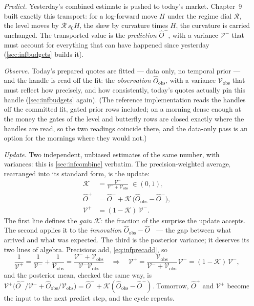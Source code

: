\emph{Predict.}  Yesterday's combined estimate is pushed to today's
market.  Chapter~9 built exactly this transport: for a log-forward
move $H$ under the regime dial $\mathcal{R}$, the level moves by
$\mathcal{R}\,s_0H$, the skew by curvature times $H$, the curvature
is carried unchanged.  The transported value is the
\emph{prediction} $\hat O^{-}$, with a variance
$\mathcal{V}^{-}$ that must account for everything that can have
happened since yesterday (\cref{sec:infbudgets} builds it).

\emph{Observe.}  Today's prepared quotes are fitted --- data only,
no temporal prior --- and the handle is read off the fit: the
\emph{observation} $\hat O_{\mathrm{obs}}$, with a variance
$\mathcal{V}_{\mathrm{obs}}$ that must reflect how precisely, and
how consistently, today's quotes actually pin this handle
(\cref{sec:infbudgets} again).  (The reference implementation reads
the handles off the committed fit, gated prior rows included; on a
morning dense enough at the money the gates of the level and
butterfly rows are closed exactly where the handles are read, so the
two readings coincide there, and the data-only pass is an option
for the mornings where they would not.)

\emph{Update.}  Two independent, unbiased estimates of the same
number, with variances: this is \cref{sec:infcombine} verbatim.
The precision-weighted average, rearranged into its standard form,
is the update:
\begin{equation}
\boxed{\;
\begin{aligned}
\mathcal{K}
&=\frac{\mathcal{V}^{-}}{\mathcal{V}^{-}+\mathcal{V}_{\mathrm{obs}}}
\;\in(0,1),\\
\hat O^{+}
&=\hat O^{-}+\mathcal{K}\,\bigl(\hat O_{\mathrm{obs}}-\hat O^{-}\bigr),\\
\mathcal{V}^{+}
&=(1-\mathcal{K})\,\mathcal{V}^{-}.
\end{aligned}
\;}
\label{eq:infupdate}
\end{equation}
The first line defines the \emph{gain} $\mathcal{K}$: the fraction
of the surprise the update accepts.  The second applies it to the
\emph{innovation} $\hat O_{\mathrm{obs}}-\hat O^{-}$ --- the gap
between what arrived and what was expected.  The third is the
posterior variance; it deserves its two lines of algebra.
Precisions add, \cref{eq:infprecadd}, so
\[
\frac{1}{\mathcal{V}^{+}}
=\frac{1}{\mathcal{V}^{-}}+\frac{1}{\mathcal{V}_{\mathrm{obs}}}
=\frac{\mathcal{V}^{-}+\mathcal{V}_{\mathrm{obs}}}
{\mathcal{V}^{-}\mathcal{V}_{\mathrm{obs}}}
\quad\Longrightarrow\quad
\mathcal{V}^{+}
=\frac{\mathcal{V}_{\mathrm{obs}}}
{\mathcal{V}^{-}+\mathcal{V}_{\mathrm{obs}}}\,\mathcal{V}^{-}
=(1-\mathcal{K})\,\mathcal{V}^{-},
\]
and the posterior mean, checked the same way, is
$\mathcal{V}^{+}\bigl(\hat O^{-}/\mathcal{V}^{-}
+\hat O_{\mathrm{obs}}/\mathcal{V}_{\mathrm{obs}}\bigr)
=\hat O^{-}+\mathcal{K}(\hat O_{\mathrm{obs}}-\hat O^{-})$.
Tomorrow, $\hat O^{+}$ and $\mathcal{V}^{+}$ become the input to the
next predict step, and the cycle repeats.

